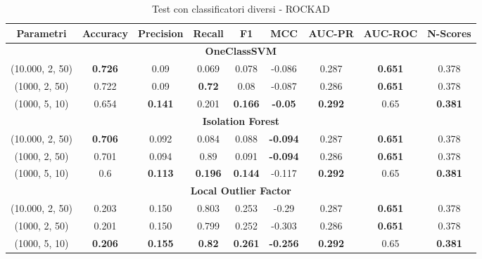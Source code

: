 \begin{table}[!ht]
    \centering
    \begin{adjustbox}{max width=\textwidth}
    \begin{tabular}{|c|c|c|c|c|c|c|c|c|}
    \hline
         \textbf{Parametri} & \textbf{Accuracy} &\textbf{Precision}  & \textbf{Recall} & \textbf{F1} & \textbf{MCC} & \textbf{AUC-PR} & \textbf{AUC-ROC} & \textbf{N-Scores}\\
        \hline
        \multicolumn{9}{|c|}{\textbf{OneClassSVM}} \\
        \hline
         (10.000, 2, 50)&\textbf{0.726}& 0.09& 0.069& 0.078&-0.086& 0.287 &\textbf{0.651} & 0.378\\
         \hline
         (1000, 2, 50) &0.722& 0.09& \textbf{0.72}& 0.08&-0.087& 0.286 &\textbf{0.651} & 0.378\\
         \hline
        (1000, 5, 10)&0.654 &\textbf{0.141} &0.201 &\textbf{0.166} & \textbf{-0.05}& \textbf{0.292}& 0.65&\textbf{0.381}\\
         \hline
         \multicolumn{9}{|c|}{\textbf{Isolation Forest}} \\
         \hline
         (10.000, 2, 50)&\textbf{0.706}& 0.092& 0.084& 0.088&\textbf{-0.094}& 0.287 &\textbf{0.651} & 0.378\\
         \hline
         (1000, 2, 50) &0.701& 0.094& 0.89& 0.091&\textbf{-0.094}& 0.286 &\textbf{0.651} & 0.378\\
         \hline
         (1000, 5, 10)&0.6 &\textbf{0.113} &\textbf{0.196} &\textbf{0.144} & -0.117& \textbf{0.292}& 0.65&\textbf{0.381}\\
         \hline
         \multicolumn{9}{|c|}{\textbf{Local Outlier Factor}} \\
         \hline
         (10.000, 2, 50)&0.203 &0.150 &0.803 &0.253 &-0.29 &0.287 &\textbf{0.651}& 0.378\\
         \hline
         (1000, 2, 50)&0.201 &0.150 &0.799 &0.252 & -0.303 &0.286 &\textbf{0.651}& 0.378\\
         \hline
         (1000, 5, 10)&\textbf{0.206} &\textbf{0.155} &\textbf{0.82} &\textbf{0.261} &\textbf{-0.256} &\textbf{0.292} &0.65& \textbf{0.381}\\
         \hline
    \end{tabular}
    \end{adjustbox}
    \caption{Test con classificatori diversi - ROCKAD}
    \label{tab:ROCKAD_NASA_AlgoritmiVari_ROCKAD}
\end{table}

